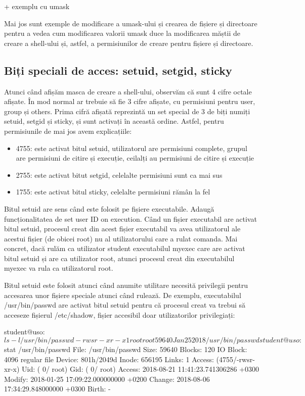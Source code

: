 + exemplu cu umask

Mai jos sunt exemple de modificare a umask-ului și crearea de fișiere și
directoare pentru a vedea cum modificarea valorii umask duce la modificarea
măștii de creare a shell-ului și, astfel, a permisiunilor de creare pentru
fișiere și directoare.

\subsection{Biți speciali de acces: setuid, setgid, sticky}
\label{sec:users-fs-perms-special}

Atunci când afișăm masca de creare a shell-ului, observăm că sunt 4 cifre octale
afișate. În mod normal ar trebuie să fie 3 cifre afișate, cu permisiuni pentru
user, group și others. Prima cifră afișată reprezintă un set special de 3 de
biți numiți setuid, setgid și sticky, și sunt activați în această ordine.
Astfel, pentru permisiunile de mai jos avem explicațiile:

\begin{itemize}
	\item 4755: este activat bitul setuid, utilizatorul are permisiuni
		complete, grupul are permisiuni de citire și execuție, ceilalți
		au permisiuni de citire și execuție
	\item 2755: este activat bitut setgid, celelalte permisiuni sunt ca mai
		sus
	\item 1755: este activat bitul sticky, celelalte permisiuni rămân la fel
\end{itemize}

Bitul setuid are sens când este folosit pe fișiere executabile. Adaugă
funcționalitatea de set user ID on execution. Când un fișier executabil are
activat bitul setuid, procesul creat din acest fișier executabil va avea
utilizatorul ale acestui fișier (de obicei root) nu al utilizatorului care a
rulat comanda. Mai concret, dacă rulăm ca utilizator student executabilul myexec
care are activat bitul setuid și are ca utilizator root, atunci procesul creat
din executabilul myexec va rula ca utilizatorul root.

Bitul setuid este folosit atunci când anumite utilitare necesită privilegii
pentru accesarea unor fișiere speciale atunci când rulează. De exemplu,
executabilul /usr/bin/passwd are activat bitul setuid pentru că procesul creat
va trebui să acceseze fișierul /etc/shadow, fișier accesibil doar utilizatorilor
privilegiați:

\begin{screen}
student@uso:~$ ls -l /usr/bin/passwd
-rwsr-xr-x 1 root root 59640 Jan 25  2018 /usr/bin/passwd
student@uso:~$ stat /usr/bin/passwd
  File: /usr/bin/passwd
  Size: 59640             Blocks: 120        IO Block: 4096   regular file
Device: 801h/2049d        Inode: 656195      Links: 1
Access: (4755/-rwsr-xr-x)  Uid: (    0/    root)   Gid: (    0/    root)
Access: 2018-08-21 11:41:23.741306286 +0300
Modify: 2018-01-25 17:09:22.000000000 +0200
Change: 2018-08-06 17:34:29.848000000 +0300
 Birth: -
\end{screen}

